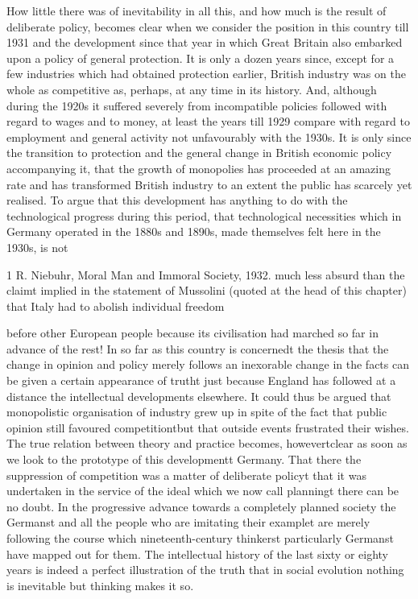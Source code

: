 \documentclass[11pt,openany]{book}
\begin{document}
How little there was of inevitability in all this, and how much is the result of deliberate policy, becomes clear when we consider the position in this country till 1931 and the development since that year in which Great Britain also embarked upon a policy of general protection. It is only a dozen years since, except for a few industries which had obtained protection earlier, British industry was on the whole as competitive as, perhaps, at any time in its history. And, although during the 1920s it suffered severely from incompatible policies followed with regard to wages and to money, at least the years till 1929 compare with regard to employment and general activity not unfavourably with the 1930s. It is only since the transition to protection and the general change in British economic policy accompanying it, that the growth of monopolies has proceeded at an amazing rate and has transformed British industry to an extent the public has scarcely yet realised. To argue that this development has anything to do with the technological progress during this period, that technological necessities which in Germany operated in the 1880s and 1890s, made themselves felt here in the 1930s, is not

1 R. Niebuhr, Moral Man and Immoral Society, 1932. much less absurd than the claimt implied in the statement of Mussolini (quoted at the head of this chapter) that Italy had to abolish individual freedom

before other European people because its civilisation had marched so far in advance of the rest! In so far as this country is concernedt the thesis that the change in opinion and policy merely follows an inexorable change in the facts can be given a certain appearance of trutht just because England has followed at a distance the intellectual developments elsewhere. It could thus be argued that monopolistic organisation of industry grew up in spite of the fact that public opinion still favoured competitiontbut that outside events frustrated their wishes. The true relation between theory and practice becomes, howevertclear as soon as we look to the prototype of this developmentt Germany. That there the suppression of competition was a matter of deliberate policyt that it was undertaken in the service of the ideal which we now call planningt there can be no doubt. In the progressive advance towards a completely planned society the Germanst and all the people who are imitating their examplet are merely following the course which nineteenth-century thinkerst particularly Germanst have mapped out for them. The intellectual history of the last sixty or eighty years is indeed a perfect illustration of the truth that in social evolution nothing is inevitable but thinking makes it so.
\end{document}
